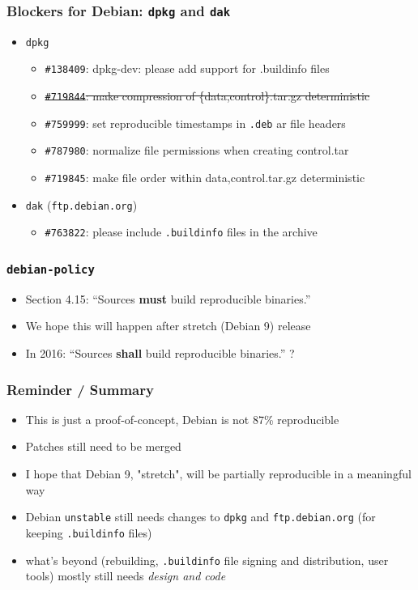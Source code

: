 \documentclass[14pt,aspectratio=169]{beamer}
\begin{document}
\begin{frame}
 \frametitle{Blockers for Debian: \texttt{dpkg} and \texttt{dak}}
 \begin{itemize}
  \item \texttt{dpkg}
 \begin{itemize}
  \item \texttt{\#138409}: dpkg-dev: please add support for .buildinfo files
  \item \sout{\texttt{\#719844}: make compression of \{data,control\}.tar.gz deterministic}
  \item \texttt{\#759999}: set reproducible timestamps in \texttt{.deb} ar file headers
  \item \texttt{\#787980}: normalize file permissions when creating control.tar
  \item \texttt{\#719845}: make file order within {data,control}.tar.gz deterministic
 \end{itemize}
 \item \texttt{dak} (\texttt{ftp.debian.org})
 \begin{itemize}
  \item \texttt{\#763822}: please include \texttt{.buildinfo} files in the archive
 \end{itemize}
 \end{itemize}
\end{frame}

\begin{frame}
 \frametitle{\texttt{debian-policy}}

 \begin{itemize}
  \item Section 4.15: “Sources \textbf{must} build reproducible binaries.”
  \item<2-3> We hope this will happen after stretch (Debian 9) release
  \item<3> In 2016: “Sources \textbf{shall} build reproducible binaries.” ?
 \end{itemize}
\end{frame}

\begin{frame}
 \frametitle{Reminder / Summary}
 \begin{itemize}
  \item This is just a proof-of-concept, Debian is not 87\% reproducible
  \item Patches still need to be merged
  \item<2-4> I hope that Debian 9, "stretch", will be partially reproducible in a meaningful way
  \item<3-4> Debian \texttt{unstable} still needs changes to \texttt{dpkg} and
  \texttt{ftp.debian.org} (for keeping \texttt{.buildinfo} files)
  \item<4> what's beyond (rebuilding, \texttt{.buildinfo} file signing and
  distribution, user tools) mostly still needs \it{design} and code

 \end{itemize}
\end{frame}
\end{document}
